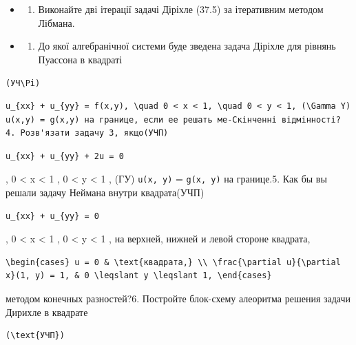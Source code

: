 \documentclass[
  ukrainian,
]{article}
\providecommand{\tightlist}{%
  \setlength{\itemsep}{0pt}\setlength{\parskip}{0pt}}
\begin{document}
\begin{itemize}
\tightlist
\item
  \begin{enumerate}
  \def\labelenumi{\arabic{enumi}.}
  \setcounter{enumi}{1}
  \tightlist
  \item
    Виконайте дві ітерації задачі Діріхле (37.5) за ітеративним методом
    Лібмана.
  \end{enumerate}
\item
  \begin{enumerate}
  \def\labelenumi{\arabic{enumi}.}
  \setcounter{enumi}{2}
  \tightlist
  \item
    До якої алгебранічної системи буде зведена задача Діріхле для
    рівнянь Пуассона в квадраті
  \end{enumerate}
\end{itemize}

\texttt{(УЧ\textbackslash{}Pi)}

\begin{verbatim}
u_{xx} + u_{yy} = f(x,y), \quad 0 < x < 1, \quad 0 < y < 1, (\Gamma Y) u(x,y) = g(x,y) на границе, если ее решать ме-Скінченні відмінності? 4. Розв'язати задачу 3, якщо(УЧП)
\end{verbatim}

\begin{verbatim}
u_{xx} + u_{yy} + 2u = 0
\end{verbatim}

, 0 \textless{} x \textless{} 1 , 0 \textless{} y \textless{} 1 , (ГУ)
\texttt{u(x,\ y)} = \texttt{g(x,\ y)} на границе.5. Как бы вы решали
задачу Неймана внутри квадрата(УЧП)

\begin{verbatim}
u_{xx} + u_{yy} = 0
\end{verbatim}

, 0 \textless{} x \textless{} 1 , 0 \textless{} y \textless{} 1 , на
верхней, нижней и левой стороне квадрата,

\begin{verbatim}
\begin{cases} u = 0 & \text{квадрата,} \\ \frac{\partial u}{\partial x}(1, y) = 1, & 0 \leqslant y \leqslant 1, \end{cases}
\end{verbatim}

методом конечных разностей?6. Постройте блок-схему алеоритма решения
задачи Дирихле в квадрате

\begin{verbatim}
(\text{УЧП})
\end{verbatim}
\end{document}
